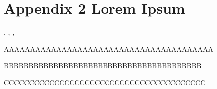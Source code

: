 
%


\chapter{Appendix 2 Lorem Ipsum}
\label{app:lorem_ipsum2}

\cite{wiki:sound-restaurants},
\cite{cit-mopidy},
\cite{cit-multiaudio},
\cite{cit-FoodResearch}


\begin{newpdflayout}{210mm}{297mm}%

AAAAAAAAAAAAAAAAAAAAAAAAAAAAAAAAAAAAAAAA

\lipsum[1-9]

BBBBBBBBBBBBBBBBBBBBBBBBBBBBBBBBBBBBBBBB
\end{newpdflayout}

CCCCCCCCCCCCCCCCCCCCCCCCCCCCCCCCCCCCCCCC

\lipsum[1-10]
